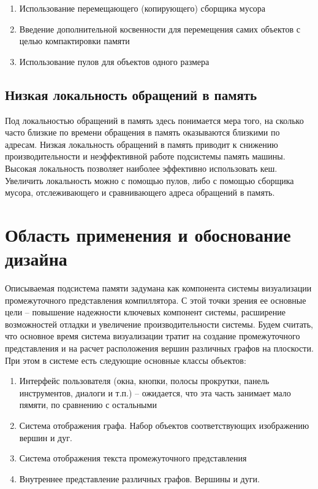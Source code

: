 \documentclass{article}
\begin{document}
\begin{enumerate}
\item  Использование перемещающего (копирующего) сборщика мусора
\item  Введение дополнительной косвенности для перемещения самих объектов с целью компактировки памяти
\item  Использование пулов для объектов одного размера
\end{enumerate}

\subsection{Низкая локальность обращений в память}
Под локальностью обращений в память здесь понимается мера того, на сколько часто близкие по времени обращения в память оказываются близкими по адресам. Низкая локальность обращений в память приводит к снижению производительности и неэффективной работе подсистемы память машины. Высокая локальность позволяет наиболее эффективно использовать кеш. Увеличить локальность можно с помощью пулов, либо с помощью сборщика мусора, отслеживающего и сравнивающего адреса обращений в память.

\section{Область применения и обоснование дизайна}
Описываемая подсистема памяти задумана как компонента системы визуализации промежуточного представления компиллятора. С этой точки зрения ее основные цели -- повышение надежности ключевых компонент системы, расширение возможностей отладки и увеличение производительности системы. Будем считать, что основное время система визуализации тратит на создание промежуточного представления и на расчет расположения вершин различных графов на плоскости. При этом в системе есть следующие основные классы объектов:

\begin{enumerate}
\item  Интерфейс пользователя (окна, кнопки, полосы прокрутки, панель инструментов, диалоги и т.п.) -- ожидается, что эта часть занимает мало пямяти, по сравнению с остальными

\item  Система отображения графа. Набор объектов соответствующих изображению вершин и дуг.

\item  Система отображения текста промежуточного представления

\item  Внутреннее представление различных графов. Вершины и дуги.
\end{enumerate}
\end{document}
